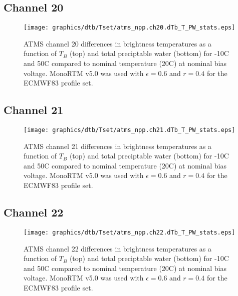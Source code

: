 \subsection{Channel 20}
\begin{figure}[H]
  \label{fig:Tset.ch20_dtb}
  \centering
  \hspace{1.5cm}\texttt{[image: graphics/dtb/Tset/atms\_npp.ch20.dTb\_T\_PW\_stats.eps]}
  \caption{ATMS channel 20 differences in brightness temperatures as a function of $T_B$ (top) and total preciptable water (bottom) for -10\textdegree{}C and 50\textdegree{}C compared to nominal temperature (20\textdegree{}C) at nominal bias voltage. MonoRTM v5.0 was used with $\epsilon=0.6$ and $r=0.4$ for the ECMWF83 profile set.}
\end{figure}

\subsection{Channel 21}
\begin{figure}[H]
  \label{fig:Tset.ch21_dtb}
  \centering
  \hspace{1.5cm}\texttt{[image: graphics/dtb/Tset/atms\_npp.ch21.dTb\_T\_PW\_stats.eps]}
  \caption{ATMS channel 21 differences in brightness temperatures as a function of $T_B$ (top) and total preciptable water (bottom) for -10\textdegree{}C and 50\textdegree{}C compared to nominal temperature (20\textdegree{}C) at nominal bias voltage. MonoRTM v5.0 was used with $\epsilon=0.6$ and $r=0.4$ for the ECMWF83 profile set.}
\end{figure}

\subsection{Channel 22}
\begin{figure}[H]
  \label{fig:Tset.ch22_dtb}
  \centering
  \hspace{1.5cm}\texttt{[image: graphics/dtb/Tset/atms\_npp.ch22.dTb\_T\_PW\_stats.eps]}
  \caption{ATMS channel 22 differences in brightness temperatures as a function of $T_B$ (top) and total preciptable water (bottom) for -10\textdegree{}C and 50\textdegree{}C compared to nominal temperature (20\textdegree{}C) at nominal bias voltage. MonoRTM v5.0 was used with $\epsilon=0.6$ and $r=0.4$ for the ECMWF83 profile set.}
\end{figure}
